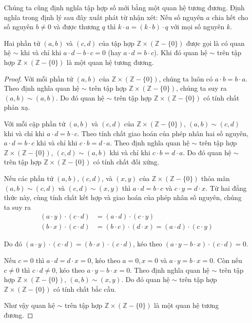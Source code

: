 Chúng ta cũng định nghĩa tập hợp số mới bằng một quan hệ tương đương. Định nghĩa trong định lý sau đây xuất phát từ nhận xét: Nếu số nguyên $a$ chia hết cho số nguyên $b\ne 0$ và được thương $q$ thì $k\cdot a = (k\cdot b)\cdot q$ với mọi số nguyên $k$.

\begin{theorem}
	Hai phần tử $(a, b)$ và $(c, d)$ của tập hợp $\mathbb{Z}\times(\mathbb{Z} - \{0\})$ được gọi là có quan hệ $\sim$ khi và chỉ khi $a\cdot d - b\cdot c = 0$ (hay $a\cdot d = b\cdot c$). Khi đó quan hệ $\sim$ trên tập hợp $\mathbb{Z}\times(\mathbb{Z} - \{0\})$ là một quan hệ tương đương.
\end{theorem}

\begin{proof}
	Với mỗi phần tử $(a, b)$ của $\mathbb{Z}\times(\mathbb{Z} - \{0\})$, chúng ta luôn có $a\cdot b = b\cdot a$. Theo định nghĩa quan hệ $\sim$ trên tập hợp $\mathbb{Z}\times(\mathbb{Z} - \{0\})$, chúng ta suy ra $(a, b)\sim (a, b)$. Do đó quan hệ $\sim$ trên tập hợp $\mathbb{Z}\times(\mathbb{Z} - \{0\})$ có tính chất phản xạ.

	Với mỗi cặp phần tử $(a, b)$ và $(c, d)$ của $\mathbb{Z}\times(\mathbb{Z} - \{0\})$, $(a, b)\sim (c, d)$ khi và chỉ khi $a\cdot d = b\cdot c$. Theo tính chất giao hoán của phép nhân hai số nguyên, $a\cdot d = b\cdot c$ khi và chỉ khi $c\cdot b = d\cdot a$.  Theo định nghĩa quan hệ $\sim$ trên tập hợp $\mathbb{Z}\times(\mathbb{Z} - \{0\})$, $(c, d)\sim (a, b)$ khi và chỉ khi $c\cdot b = d\cdot a$. Do đó quan hệ $\sim$ trên tập hợp $\mathbb{Z}\times(\mathbb{Z} - \{0\})$ có tính chất đối xứng.

	Nếu các phần tử $(a, b), (c, d)$, và $(x, y)$ của $\mathbb{Z}\times(\mathbb{Z} - \{0\})$ thỏa mãn $(a, b)\sim (c, d)$ và $(c, d)\sim (x, y)$ thì $a\cdot d = b\cdot c$ và $c\cdot y = d\cdot x$. Từ hai đẳng thức này, cùng tính chất kết hợp và giao hoán của phép nhân số nguyên, chúng ta suy ra
	\begin{align*}
		(a\cdot y)\cdot (c\cdot d) & = (a\cdot d)\cdot (c\cdot y)                              \\
		(b\cdot x)\cdot (c\cdot d) & = (b\cdot c)\cdot (d\cdot x) = (a\cdot d)\cdot (c\cdot y)
	\end{align*}

	Do đó $(a\cdot y)\cdot (c\cdot d) = (b\cdot x)\cdot (c\cdot d)$, kéo theo $(a\cdot y - b\cdot x)\cdot (c\cdot d) = 0$.

	Nếu $c = 0$ thì $a\cdot d = d\cdot x = 0$, kéo theo $a = 0, x = 0$ và $a\cdot y = b\cdot x = 0$. Còn nếu $c\ne 0$ thì $c\cdot d\ne 0$, kéo theo $a\cdot y - b\cdot x = 0$. Theo định nghĩa quan hệ $\sim$ trên tập hợp $\mathbb{Z}\times(\mathbb{Z} - \{0\})$, $(a, b)\sim (x, y)$. Do đó quan hệ $\sim$ trên tập hợp $\mathbb{Z}\times(\mathbb{Z} - \{0\})$ có tính chất bắc cầu.

	Như vậy quan hệ $\sim$ trên tập hợp $\mathbb{Z}\times(\mathbb{Z} - \{0\})$ là một quan hệ tương đương.
\end{proof}

